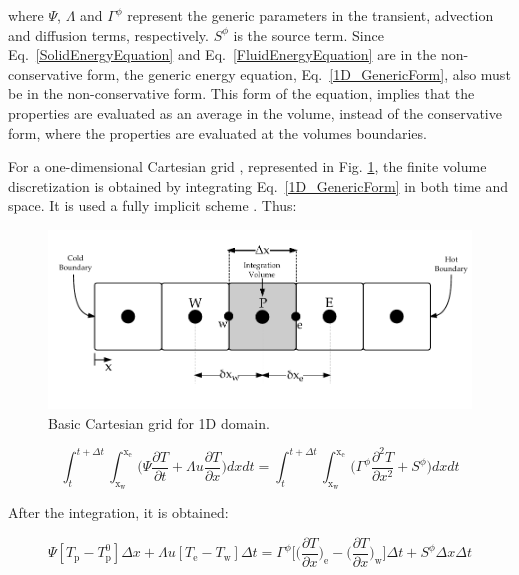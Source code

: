\documentclass[review,preprint,12pt]{elsarticle}
\begin{document}
\noindent where $\Psi$, $\Lambda$ and $\Gamma^{\phi}$ represent the generic parameters in the transient, advection and diffusion terms, respectively. $S^{\phi}$ is the source term. Since Eq.~\eqref{SolidEnergyEquation} and Eq.~\eqref{FluidEnergyEquation} are in the non-conservative form, the generic energy equation, Eq.~\eqref{1D_GenericForm}, also must be in the non-conservative form. This form of the equation, implies that the properties are evaluated as an average in the volume, instead of the conservative form, where the properties are evaluated at the volumes boundaries. 

For a one-dimensional Cartesian grid , represented in Fig. \ref{fig:1D_grid}, the finite volume discretization is obtained by integrating Eq.~\eqref{1D_GenericForm} in both time and space. It is used a fully implicit scheme \cite{Patankar1980,Maliska2004}. Thus:

\begin{figure}[!ht]
  \centering
  \includegraphics[scale=0.8]{1D_grid.pdf}
  \caption{Basic Cartesian grid for 1D domain.}
  \label{fig:1D_grid}
\end{figure}

\begin{equation}
\int_{t}^{t+\Delta t}\int_\mathrm{x_w}^\mathrm{x_e}\Biggl(\Psi\frac{\partial T}{\partial t} + \Lambda u \frac{\partial T}{\partial x}\Biggl)dxdt = \int_{t}^{t+\Delta t}\int_\mathrm{x_w}^\mathrm{x_e}\Biggl(\Gamma^{\phi} \frac{\partial^{2}T}{\partial x^2} + S^{\phi}\Biggl) dxdt
\label{1D_FVM1}
\end{equation}

After the integration, it is obtained:

\begin{equation}
\Psi[T_\mathrm{p}-T^0_\mathrm{p}]\Delta x +\Lambda u[T_\mathrm{e} - T_\mathrm{w}]\Delta t = \Gamma^{\phi}\Bigg[\Bigg(\frac{\partial T}{\partial x}\Bigg)_\mathrm{e}-\Bigg(\frac{\partial T}{\partial x}\Bigg)_\mathrm{w}\Bigg]\Delta t + S^{\phi}\Delta x\Delta t
\label{1D_FVM1_2}
\end{equation}
\end{document}
